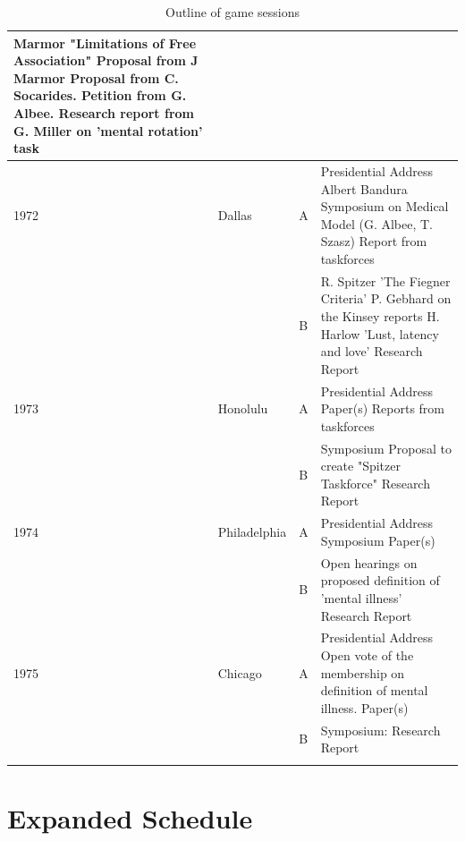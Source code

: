 \begin{refsection}
\begin{longtable}[!t]{ | p{1cm} | p{2cm} | p{1cm} |  p{10cm} | }
Marmor "Limitations of Free Association"\newline
Proposal from J Marmor\newline
Proposal from C. Socarides.\newline
Petition from G. Albee.\newline
Research report from G. Miller on 'mental rotation' task\\ \hline
1972&Dallas&A&Presidential Address\: Albert Bandura\newline
Symposium on Medical Model (G. Albee, T. Szasz)\newline
Report from taskforces\\
&&B&
R. Spitzer 'The Fiegner Criteria'\newline
P. Gebhard on the Kinsey reports\newline
H. Harlow 'Lust, latency and love'\newline
Research Report\\ \hline
1973&Honolulu&A&
Presidential Address\: \newline
Paper(s) \newline
Reports from taskforces\\
&&B&
Symposium\:\newline
Proposal to create "Spitzer Taskforce"\newline
Research Report\\ \hline
1974&Philadelphia&A
&Presidential Address\:\newline
Symposium\:\newline
Paper(s)\\
&&B&
Open hearings on proposed definition of 'mental illness'\newline
Research Report\\ \hline
1975&Chicago&A&
Presidential Address\:\newline
Open vote of the membership on definition of mental illness.\newline
Paper(s)\\
&&B&
Symposium:\newline
Research Report\\
\hline

\caption{Outline of game sessions}
\label{table: outlineGameSessions}
\end{longtable}

\section{Expanded Schedule}
\label{expandedschedule}


\end{refsection}
